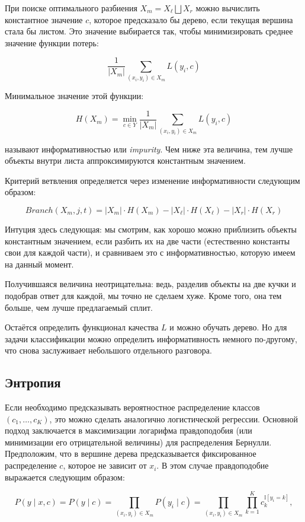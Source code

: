 \begin{itemize}
При поиске оптимального разбиения $X_m = X_\ell \bigsqcup X_r$ можно вычислить константное значение $c$, которое предсказало бы дерево, если текущая вершина стала бы листом. Это значение выбирается так, чтобы минимизировать среднее значение функции потерь:

\[
\frac{1}{|X_m|} \sum_{(x_i, y_i) \in X_m} L(y_i, c)
\]

Минимальное значение этой функции:

\[
H(X_m) = \min_{c \in Y} \frac{1}{|X_m|} \sum_{(x_i, y_i) \in X_m} L(y_i, c)
\]

называют информативностью или \textit{impurity}. Чем ниже эта величина, тем лучше объекты внутри листа аппроксимируются константным значением.

Критерий ветвления определяется через изменение информативности следующим образом:

\[
Branch(X_m, j, t) = |X_m| \cdot H(X_m) - |X_\ell| \cdot H(X_\ell) - |X_r| \cdot H(X_r)
\]

Интуция здесь следующая: мы смотрим, как хорошо можно приблизить объекты константным значением, если разбить их на две части (естественно константы свои для каждой части), и сравниваем это с информативностью, которую имеем на данный момент.

Получившаяся величина неотрицательна: ведь, разделив объекты на две кучки и подобрав ответ для каждой, мы точно не сделаем хуже. Кроме того, она тем больше, чем лучше предлагаемый сплит.

Остаётся определить функционал качества $L$ и можно обучать дерево. Но для задачи классификации можно определить информативность немного по-другому, что снова заслуживает небольшого отдельного разговора.

\subsection{Энтропия}
Если необходимо предсказывать вероятностное распределение классов $(c_1, \dots, c_K)$, это можно сделать аналогично логистической регрессии. Основной подход заключается в максимизации логарифма правдоподобия (или минимизации его отрицательной величины) для распределения Бернулли. Предположим, что в вершине дерева предсказывается фиксированное распределение $c$, которое не зависит от $x_i$. В этом случае правдоподобие выражается следующим образом:

\[
P(y \mid x, c) = P(y \mid c) = \prod_{(x_i, y_i) \in X_m} P(y_i \mid c) = \prod_{(x_i, y_i) \in X_m} \prod_{k=1}^K c_k^{\mathbb{I}[y_i = k]},
\]


\end{itemize}
